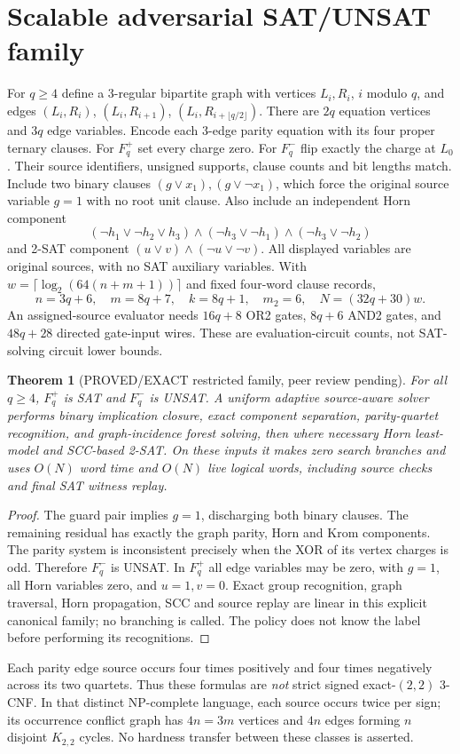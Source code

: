 \documentclass[11pt]{article}
\newtheorem{theorem}{Theorem}
\begin{document}
\section{Scalable adversarial SAT/UNSAT family}
For $q\ge4$ define a 3-regular bipartite graph with vertices $L_i,R_i$, $i$ modulo $q$, and edges $(L_i,R_i)$, $(L_i,R_{i+1})$, $(L_i,R_{i+\lfloor q/2\rfloor})$. There are $2q$ equation vertices and $3q$ edge variables. Encode each 3-edge parity equation with its four proper ternary clauses. For $F_q^+$ set every charge zero. For $F_q^-$ flip exactly the charge at $L_0$. Their source identifiers, unsigned supports, clause counts and bit lengths match. Include two binary clauses $(g\vee x_1),(g\vee\neg x_1)$, which force the original source variable $g=1$ with no root unit clause. Also include an independent Horn component
\[
(\neg h_1\vee\neg h_2\vee h_3)
\wedge(\neg h_3\vee\neg h_1)\wedge(\neg h_3\vee\neg h_2)
\]
and 2-SAT component $(u\vee v)\wedge(\neg u\vee\neg v)$. All displayed variables are original sources, with no SAT auxiliary variables. With $w=\lceil\log_2(64(n+m+1))\rceil$ and fixed four-word clause records,
\[
\boxed{n=3q+6,\quad m=8q+7,\quad k=8q+1,\quad m_2=6,\quad N=(32q+30)w.}
\]
An assigned-source evaluator needs $16q+8$ OR2 gates, $8q+6$ AND2 gates, and $48q+28$ directed gate-input wires. These are evaluation-circuit counts, not SAT-solving circuit lower bounds.

\begin{theorem}[PROVED/EXACT restricted family, peer review pending]
For all $q\ge4$, $F_q^+$ is SAT and $F_q^-$ is UNSAT. A uniform adaptive source-aware solver performs binary implication closure, exact component separation, parity-quartet recognition, and graph-incidence forest solving, then where necessary Horn least-model and SCC-based 2-SAT. On these inputs it makes zero search branches and uses $O(N)$ word time and $O(N)$ live logical words, including source checks and final SAT witness replay.
\end{theorem}
\begin{proof}
The guard pair implies $g=1$, discharging both binary clauses. The remaining residual has exactly the graph parity, Horn and Krom components. The parity system is inconsistent precisely when the XOR of its vertex charges is odd. Therefore $F_q^-$ is UNSAT. In $F_q^+$ all edge variables may be zero, with $g=1$, all Horn variables zero, and $u=1,v=0$. Exact group recognition, graph traversal, Horn propagation, SCC and source replay are linear in this explicit canonical family; no branching is called. The policy does not know the label before performing its recognitions.
\end{proof}
Each parity edge source occurs four times positively and four times negatively across its two quartets. Thus these formulas are \emph{not} strict signed exact-$(2,2)$ 3-CNF. In that distinct NP-complete language, each source occurs twice per sign; its occurrence conflict graph has $4n=3m$ vertices and $4n$ edges forming $n$ disjoint $K_{2,2}$ cycles. No hardness transfer between these classes is asserted.
\end{document}
